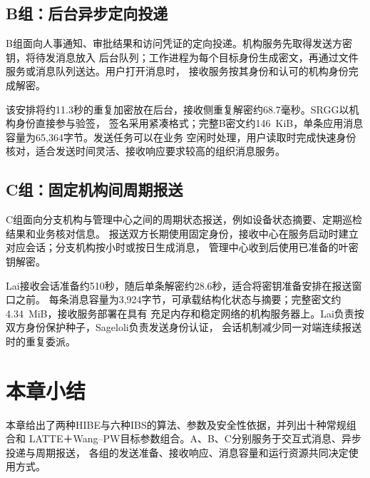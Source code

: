 \subsection{B组：后台异步定向投递}
B组面向人事通知、审批结果和访问凭证的定向投递。机构服务先取得发送方密钥，将待发消息放入
后台队列；工作进程为每个目标身份生成密文，再通过文件服务或消息队列送达。用户打开消息时，
接收服务按其身份和认可的机构身份完成解密。

该安排将约11.3秒的重复加密放在后台，接收侧重复解密约68.7毫秒。SRGG以机构身份直接参与验签，
签名采用紧凑格式；完整B密文约146~KiB，单条应用消息容量为65,364字节。发送任务可以在业务
空闲时处理，用户读取时完成快速身份核对，适合发送时间灵活、接收响应要求较高的组织消息服务。

\subsection{C组：固定机构间周期报送}
C组面向分支机构与管理中心之间的周期状态报送，例如设备状态摘要、定期巡检结果和业务核对信息。
报送双方长期使用固定身份，接收中心在服务启动时建立对应会话；分支机构按小时或按日生成消息，
管理中心收到后使用已准备的叶密钥解密。

Lai接收会话准备约510秒，随后单条解密约28.6秒，适合将密钥准备安排在报送窗口之前。
每条消息容量为3,924字节，可承载结构化状态与摘要；完整密文约4.34~MiB，接收服务部署在具有
充足内存和稳定网络的机构服务器上。Lai负责按双方身份保护种子，Sageloli负责发送身份认证，
会话机制减少同一对端连续报送时的重复委派。

\section{本章小结}
本章给出了两种HIBE与六种IBS的算法、参数及安全性依据，并列出十种常规组合和
LATTE＋Wang--PW目标参数组合。A、B、C分别服务于交互式消息、异步投递与周期报送，
各组的发送准备、接收响应、消息容量和运行资源共同决定使用方式。
